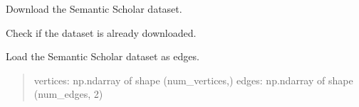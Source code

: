 \documentclass[letterpaper,10pt,english]{sphinxmanual}
\begin{document}
\begin{fulllineitems}
\begin{fulllineitems}
\begin{quote}
\begin{description}
\end{description}\end{quote}

\end{fulllineitems}


\begin{fulllineitems}
\label{\detokenize{graphem:graphem.datasets.SemanticScholarDataset.download}}
\pysigstartsignatures
{}
\pysigstopsignatures
\sphinxAtStartPar
Download the Semantic Scholar dataset.

\end{fulllineitems}


\begin{fulllineitems}
\label{\detokenize{graphem:graphem.datasets.SemanticScholarDataset.is_downloaded}}
\pysigstartsignatures
{}
\pysigstopsignatures
\sphinxAtStartPar
Check if the dataset is already downloaded.

\end{fulllineitems}


\begin{fulllineitems}
\label{\detokenize{graphem:graphem.datasets.SemanticScholarDataset.load}}
\pysigstartsignatures
{}
\pysigstopsignatures
\sphinxAtStartPar
Load the Semantic Scholar dataset as edges.
\begin{quote}\begin{description}
\sphinxAtStartPar
\begin{description}
\sphinxAtStartPar
vertices: np.ndarray of shape (num\_vertices,)
edges: np.ndarray of shape (num\_edges, 2)

\end{description}


\sphinxAtStartPar
{}

\end{description}\end{quote}

\end{fulllineitems}


\end{fulllineitems}
\end{document}
